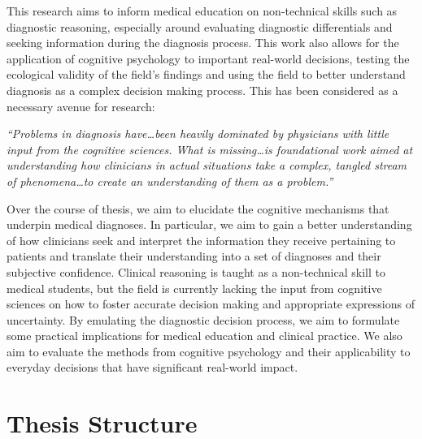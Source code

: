 \documentclass[a4paper, nobind]{templates/ociamthesis}
\begin{document}
\hfill\break
This research aims to inform medical education on non-technical skills such as diagnostic reasoning, especially around evaluating diagnostic differentials and seeking information during the diagnosis process. This work also allows for the application of cognitive psychology to important real-world decisions, testing the ecological validity of the field's findings and using the field to better understand diagnosis as a complex decision making process. This has been considered as a necessary avenue for research:

\hfill\break
\emph{``Problems in diagnosis have\ldots been heavily dominated by physicians with little input from the cognitive sciences. What is missing\ldots is foundational work aimed at understanding how clinicians in actual situations take a complex, tangled stream of phenomena\ldots to create an understanding of them as a problem.''} \autocite{wears_diagnosing_2014}

\hfill\break
Over the course of thesis, we aim to elucidate the cognitive mechanisms that underpin medical diagnoses. In particular, we aim to gain a better understanding of how clinicians seek and interpret the information they receive pertaining to patients and translate their understanding into a set of diagnoses and their subjective confidence. Clinical reasoning is taught as a non-technical skill to medical students, but the field is currently lacking the input from cognitive sciences on how to foster accurate decision making and appropriate expressions of uncertainty. By emulating the diagnostic decision process, we aim to formulate some practical implications for medical education and clinical practice. We also aim to evaluate the methods from cognitive psychology and their applicability to everyday decisions that have significant real-world impact.

\newpage

\section{Thesis Structure}\label{thesis-structure}
\end{document}

